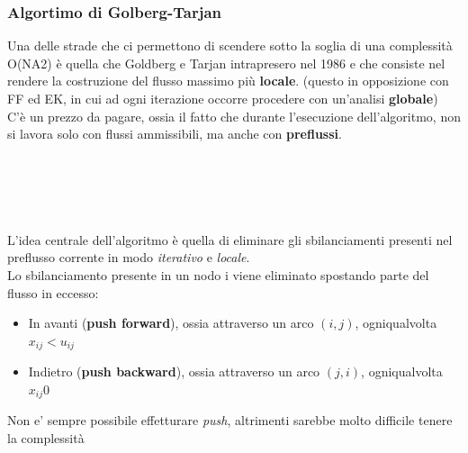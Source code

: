 \documentclass[a4paper,12pt]{article}
\begin{document}
\subsubsection{Algortimo di Golberg-Tarjan}
Una delle strade che ci permettono di scendere sotto la soglia di
una complessità O(NA2) è quella che Goldberg e Tarjan
intrapresero nel 1986 e che consiste nel rendere la costruzione del
flusso massimo più \textbf{locale}. (questo in opposizione con FF ed EK, in cui ad ogni iterazione
occorre procedere con un’analisi \textbf{globale})\\
C’è un prezzo da pagare, ossia il fatto che durante l’esecuzione
dell’algoritmo, non si lavora solo con flussi ammissibili, ma anche
con \textbf{preflussi}.\\
\vspace{1px}\\
\\
\vspace{1px}\\
\\
\vspace{1px}\\
L’idea centrale dell’algoritmo è quella di eliminare gli
sbilanciamenti presenti nel preflusso corrente in modo \textit{iterativo} e
\textit{locale}.\\
Lo sbilanciamento presente in un nodo i viene eliminato spostando
parte del flusso in eccesso:
\begin{itemize}
  \item In avanti (\textbf{push forward}), ossia attraverso un arco $(i, j)$, ogniqualvolta $x_{ij} < u_{ij}$
  \item Indietro (\textbf{push backward}), ossia attraverso un arco $(j, i)$, ogniqualvolta $x_{ij}  0$
\end{itemize}
Non e' sempre possibile effetturare \textit{push}, altrimenti sarebbe molto difficile tenere la complessità
\end{document}
